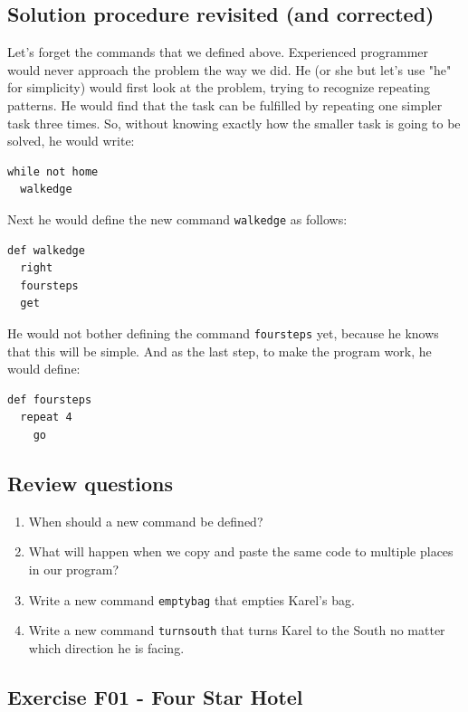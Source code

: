 \documentclass[article,A4,12pt]{llncs}
\begin{document}
\subsection{Solution procedure revisited (and corrected)}

Let's forget the commands that we defined above.
Experienced programmer would never approach the problem the way we did.
He (or she but let's use "he" for simplicity) 
would first look at the problem, trying to recognize repeating patterns. 
He would find that the task can be fulfilled by repeating one simpler task 
three times. So, without knowing exactly how the smaller task is going to 
be solved, he would write:

{\small
\begin{verbatim}
while not home
  walkedge
\end{verbatim}
}
\noindent
Next he would define the new command {\tt walkedge} as follows:

{\small
\begin{verbatim}
def walkedge
  right
  foursteps
  get
\end{verbatim}
}
\noindent
He would not bother defining the command 
{\tt foursteps} yet, because he knows that this will be 
simple. And as the last step, to make the program work, he would 
define:

{\small
\begin{verbatim}
def foursteps
  repeat 4
    go
\end{verbatim}
}

\subsection{Review questions}

\begin{enumerate}
\item When should a new command be defined?
\item What will happen when we copy and paste the same code 
      to multiple places in our program?
\item Write a new command {\tt emptybag} that empties Karel's bag.
\item Write a new command {\tt turnsouth} that turns Karel to the South no matter 
      which direction he is facing.
\end{enumerate}


\subsection{Exercise F01 - Four Star Hotel}
\end{document}
